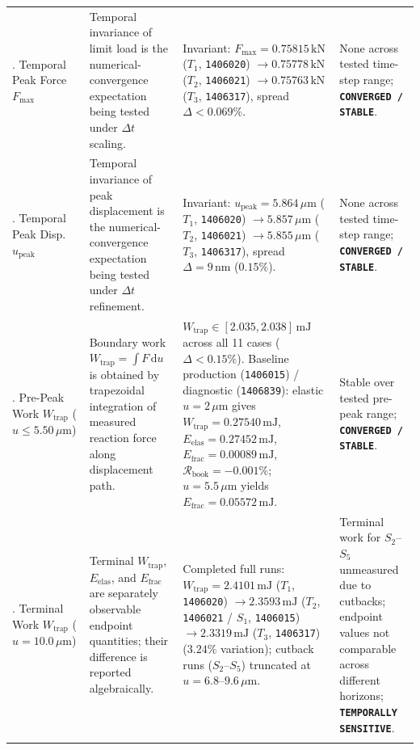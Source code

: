 \begin{table}[htbp]
\begin{tabularx}{\textwidth}{p{2.2cm}p{3.8cm}p{4.2cm}X}
\addlinespace
4. Temporal Peak Force $F_{\max}$ & Temporal invariance of limit load is the numerical-convergence expectation being tested under $\Delta t$ scaling. & Invariant: $F_{\max} = 0.75815\,\mathrm{kN}$ ($T_1$, \texttt{1406020}) $\to 0.75778\,\mathrm{kN}$ ($T_2$, \texttt{1406021}) $\to 0.75763\,\mathrm{kN}$ ($T_3$, \texttt{1406317}), spread $\Delta < 0.069\%$. & None across tested time-step range; \textbf{\texttt{CONVERGED / STABLE}}. \\
\addlinespace
5. Temporal Peak Disp. $u_{\mathrm{peak}}$ & Temporal invariance of peak displacement is the numerical-convergence expectation being tested under $\Delta t$ refinement. & Invariant: $u_{\mathrm{peak}} = 5.864\,\mu\mathrm{m}$ ($T_1$, \texttt{1406020}) $\to 5.857\,\mu\mathrm{m}$ ($T_2$, \texttt{1406021}) $\to 5.855\,\mu\mathrm{m}$ ($T_3$, \texttt{1406317}), spread $\Delta = 9\,\mathrm{nm}$ ($0.15\%$). & None across tested time-step range; \textbf{\texttt{CONVERGED / STABLE}}. \\
\addlinespace
6. Pre-Peak Work $W_{\mathrm{trap}}$ ($u \le 5.50\,\mu\mathrm{m}$) & Boundary work $W_{\mathrm{trap}} = \int F\,\mathrm{d}u$ is obtained by trapezoidal integration of measured reaction force along displacement path. & $W_{\mathrm{trap}} \in [2.035, 2.038]\,\mathrm{mJ}$ across all 11 cases ($\Delta < 0.15\%$). Baseline production (\texttt{1406015}) / diagnostic (\texttt{1406839}): elastic $u=2\,\mu\mathrm{m}$ gives $W_{\mathrm{trap}} = 0.27540\,\mathrm{mJ}$, $E_{\mathrm{elas}} = 0.27452\,\mathrm{mJ}$, $E_{\mathrm{frac}} = 0.00089\,\mathrm{mJ}$, $\mathcal{R}_{\mathrm{book}} = -0.001\%$; $u=5.5\,\mu\mathrm{m}$ yields $E_{\mathrm{frac}} = 0.05572\,\mathrm{mJ}$. & Stable over tested pre-peak range; \textbf{\texttt{CONVERGED / STABLE}}. \\
\addlinespace
7. Terminal Work $W_{\mathrm{trap}}$ ($u = 10.0\,\mu\mathrm{m}$) & Terminal $W_{\mathrm{trap}}$, $E_{\mathrm{elas}}$, and $E_{\mathrm{frac}}$ are separately observable endpoint quantities; their difference is reported algebraically. & Completed full runs: $W_{\mathrm{trap}} = 2.4101\,\mathrm{mJ}$ ($T_1$, \texttt{1406020}) $\to 2.3593\,\mathrm{mJ}$ ($T_2$, \texttt{1406021} / $S_1$, \texttt{1406015}) $\to 2.3319\,\mathrm{mJ}$ ($T_3$, \texttt{1406317}) ($3.24\%$ variation); cutback runs ($S_2$--$S_5$) truncated at $u=6.8$--$9.6\,\mu\mathrm{m}$. & Terminal work for $S_2$--$S_5$ unmeasured due to cutbacks; endpoint values not comparable across different horizons; \textbf{\texttt{TEMPORALLY SENSITIVE}}. \\
\addlinespace

\end{tabularx}
\end{table}
